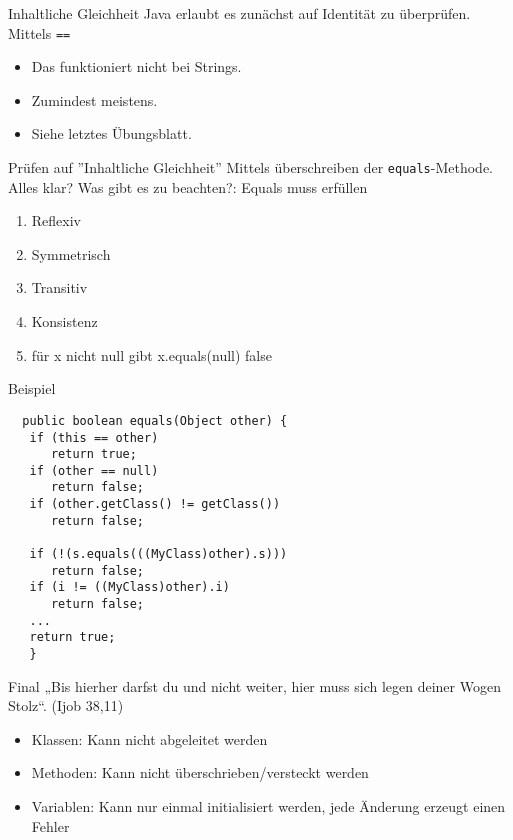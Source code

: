 \documentclass[18pt]{beamer}
\begin{document}
\begin{frame}[fragile]{Inhaltliche Gleichheit}
 Java erlaubt es zunächst auf Identität zu überprüfen.
 Mittels \verb|==|
 \begin{itemize}
  \item Das funktioniert nicht bei Strings.
  \item Zumindest meistens.
  \item Siehe letztes Übungsblatt.
 \end{itemize}
\end{frame}
\begin{frame}[fragile]{Prüfen auf ''Inhaltliche Gleichheit''}
 Mittels überschreiben der \verb|equals|-Methode. Alles klar? \pause
 Was gibt es zu beachten?:
 Equals muss erfüllen
 \begin{enumerate}
  \item Reflexiv
  \item Symmetrisch
  \item Transitiv
  \item Konsistenz
  \item für x nicht null gibt x.equals(null) false
 \end{enumerate}
\end{frame}

\begin{frame}[fragile]{Beispiel}
 \begin{lstlisting}
  public boolean equals(Object other) {
   if (this == other)
      return true;
   if (other == null)
      return false;
   if (other.getClass() != getClass())
      return false;

   if (!(s.equals(((MyClass)other).s)))
      return false;
   if (i != ((MyClass)other).i)
      return false;
   ...
   return true;
   } 
 \end{lstlisting}
\end{frame}

\begin{frame}{Final}
„Bis hierher darfst du und nicht weiter, hier muss sich legen deiner Wogen Stolz“. (Ijob 38,11)
  \pause
  
  \begin{itemize}
   \item Klassen: Kann nicht abgeleitet werden
   \item Methoden: Kann nicht überschrieben/versteckt werden
   \item Variablen: Kann nur einmal initialisiert werden, jede Änderung erzeugt einen Fehler
  \end{itemize}
\end{frame}
\end{document}
